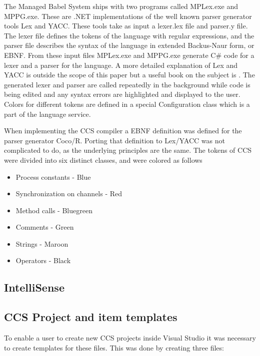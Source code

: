 	The Managed Babel System ships with two programs called MPLex.exe and 
	MPPG.exe. These are .NET implementations of the well known parser generator 
	tools Lex and YACC. These tools take as input a \textsf{lexer.lex} file and
	\textsf{parser.y} file. The lexer file defines the tokens of the language
	with regular expressions, and the parser file describes the syntax of the
	language in extended Backus-Naur form, or EBNF. From these input files 
	MPLex.exe and MPPG.exe generate C\# code for a lexer and a parser for the 
	language. A more detailed explanation of Lex and YACC is outside the scope 
	of this paper but a useful book on the subject is \cite{lexyacc}. 
	The generated lexer and parser are called repeatedly in the background while
	code is being edited and any syntax errors are highlighted and displayed to
	the user. Colors for different tokens are defined in a special 
	\textsf{Configuration} class which is a part of the language service.

	When implementing the CCS compiler a EBNF definition was defined for the
	parser generator Coco/R. Porting that definition to Lex/YACC was not 
	complicated to do, as the underlying principles are the same. The tokens of 
	CCS were divided into six distinct classes, and were colored as follows
	
	\begin{itemize}
		\item Process constants - Blue
		\item Synchronization on channels	- Red
		\item Method calls - Bluegreen
		\item Comments - Green
		\item Strings - Maroon
		\item Operators - Black
	\end{itemize}
	
	\subsection{IntelliSense}

	\subsection{CCS Project and item templates}
	To enable a user to create new CCS projects inside Visual Studio it was 
	necessary to create templates for these files. This was done by creating 
	three files:
	
